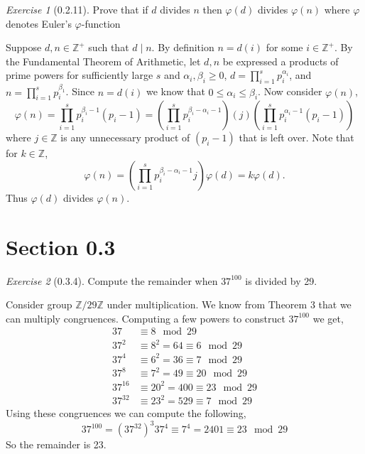 \documentclass[12pt]{amsart}
\makeatletter
\theoremstyle{remark}
\newtheorem*{exercise}{Exercise}%
\def\ZZ{\ensuremath{\mathbb Z}}
\renewenvironment{proof}[1][\proofname]{\par\doublespacing
  \pushQED{\qed}%
  \normalfont \topsep6\p@\@plus6\p@\relax
  \list{}{%
    \settowidth{\leftmargin}{\itshape\proofname:\hskip\labelsep}%
    \setlength{\labelwidth}{0pt}%
    \setlength{\itemindent}{-\leftmargin}%
  }%
  \item[\hskip\labelsep\itshape#1\@addpunct{:}]\ignorespaces
}{%
  \popQED\endlist\@endpefalse
  \singlespacing
}
\theoremstyle{mycomment}
\makeatother
\begin{document}
    \begin{exercise}[0.2.11] Prove that if $d$ divides $n$ then $\varphi(d)$ divides $\varphi(n)$ where $\varphi$ denotes Euler's $\varphi$-function
      \begin{proof}
        Suppose $d, n \in \ZZ^{+}$ such that $d \mid n$. By definition $n = d(i)$ for some $i \in \ZZ^{+}$. 
        By the Fundamental Theorem of Arithmetic, let $d, n$ be expressed a products of prime powers for sufficiently large $s$ and $\alpha_i,\beta_i \geq 0$,
        $d = \prod_{i = 1}^s p_i^{\alpha_i}$, and $n = \prod_{i = 1}^s p_i^{\beta_1}$. Since $n = d(i)$ we know that $0 \leq \alpha_i \leq \beta_i$. 
        Now consider $\varphi(n)$,
        \begin{equation*}
          \varphi(n) = \prod_{i = 1}^s p_i^{\beta_i - 1}(p_i  - 1) = \left(\prod_{i = 1}^s p_i^{\beta_i - \alpha_i - 1}\right)(j)\left(\prod_{i = 1}^s p_i^{\alpha_i - 1}(p_i  - 1)\right) 
        \end{equation*}
        where $j \in \ZZ$ is any unnecessary product of $(p_i - 1)$ that is left over. Note that for $k \in \ZZ$, 
        \begin{equation*}
          \varphi(n) = (\prod_{i = 1}^s p_i^{\beta_i - \alpha_i - 1}j)\varphi(d) = k\varphi(d).
        \end{equation*}
        Thus $\varphi(d)$ divides $\varphi(n)$.
      \end{proof}
      \end{exercise}




\section*{\textbf{Section 0.3}}
\begin{exercise}[0.3.4] Compute the remainder when $37^{100}$ is divided by 29. 
  \begin{proof}[Solution:]
    Consider group $\ZZ/29\ZZ$ under multiplication. We know from Theorem 3 that we can multiply congruences. Computing a few powers 
    to construct $37^100$ we get,  
    \begin{align*}
      37 &\equiv 8\mod 29\\
      37^2 &\equiv 8^2 = 64 \equiv 6\mod 29\\
      37^4 &\equiv 6^2 = 36 \equiv 7\mod 29\\
      37^8 &\equiv 7^2 = 49 \equiv 20\mod 29\\
      37^{16} &\equiv 20^2 = 400 \equiv 23\mod 29\\
      37^{32} &\equiv 23^2 = 529 \equiv 7\mod 29
    \end{align*}
    Using these congruences we can compute the following, 
    \begin{equation*}
      37^{100} = (37^{32})^3 37^{4} \equiv 7^4 = 2401 \equiv 23\mod 29 
    \end{equation*}
    So the remainder is 23.
  \end{proof}
\end{exercise}
\end{document}
